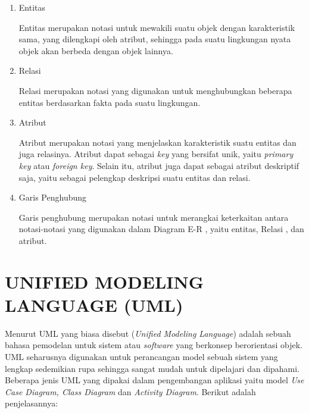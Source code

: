 \begin{enumerate}
	\item Entitas
	\par Entitas merupakan notasi untuk mewakili suatu objek dengan karakteristik sama, yang dilengkapi oleh atribut, sehingga pada suatu lingkungan nyata objek akan berbeda dengan objek lainnya.
	\pagebreak
	\item Relasi
	\par Relasi merupakan notasi yang digunakan untuk menghubungkan beberapa entitas berdasarkan fakta pada suatu lingkungan.
	\item Atribut
	\par Atribut merupakan notasi yang menjelaskan karakteristik suatu entitas dan juga relasinya. Atribut dapat sebagai \textit{key} yang bersifat unik, yaitu \textit{primary key} atau \textit{foreign key}. Selain itu, atribut juga dapat sebagai atribut deskriptif saja, yaitu sebagai pelengkap deskripsi suatu entitas dan relasi.	
	\item Garis Penghubung
	\par Garis penghubung merupakan notasi untuk merangkai keterkaitan antara notasi-notasi yang digunakan dalam Diagram E-R , yaitu entitas, Relasi , dan atribut.
\end{enumerate}

\section{\uppercase{UNIFIED MODELING LANGUAGE (UML)}}
Menurut \citep{nugraha2016perancangan} UML yang biasa disebut (\textit{Unified Modeling Language}) adalah sebuah bahasa pemodelan untuk sistem atau \textit{software} yang berkonsep berorientasi objek. UML seharusnya digunakan untuk perancangan model sebuah sistem yang lengkap sedemikian rupa sehingga sangat mudah untuk dipelajari dan dipahami. Beberapa jenis UML yang dipakai dalam pengembangan aplikasi yaitu model \textit{Use Case Diagram, Class Diagram} dan \textit{Activity Diagram}. Berikut adalah penjelasannya:

